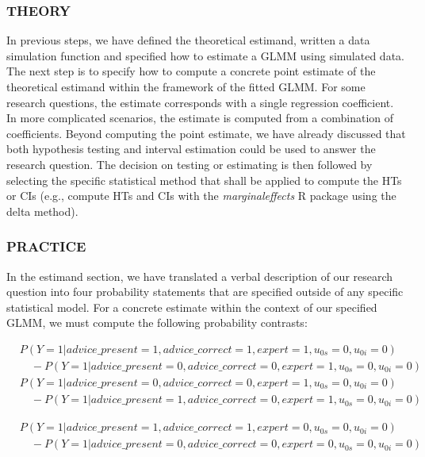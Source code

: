 \documentclass[
  man,
  floatsintext,
  longtable,
  a4paper,
  nolmodern,
  notxfonts,
  notimes,
  colorlinks=true,linkcolor=blue,citecolor=blue,urlcolor=blue]{apa7}
\begin{document}
\subsubsection{THEORY}\label{theory-7}

In previous steps, we have defined the theoretical estimand, written a
data simulation function and specified how to estimate a GLMM using
simulated data. The next step is to specify how to compute a concrete
point estimate of the theoretical estimand within the framework of the
fitted GLMM. For some research questions, the estimate corresponds with
a single regression coefficient. In more complicated scenarios, the
estimate is computed from a combination of coefficients. Beyond
computing the point estimate, we have already discussed that both
hypothesis testing and interval estimation could be used to answer the
research question. The decision on testing or estimating is then
followed by selecting the specific statistical method that shall be
applied to compute the HTs or CIs (e.g., compute HTs and CIs with the
\emph{marginaleffects} R package using the delta method).

\subsubsection{PRACTICE}\label{practice-7}

In the estimand section, we have translated a verbal description of our
research question into four probability statements that are specified
outside of any specific statistical model. For a concrete estimate
within the context of our specified GLMM, we must compute the following
probability contrasts:

\[
\begin{aligned}
& P(Y=1|advice\_present = 1, advice\_correct = 1, expert = 1, u_{0s} = 0, u_{0i} = 0) \\
& \quad - P(Y=1|advice\_present = 0, advice\_correct = 0, expert = 1, u_{0s} = 0, u_{0i} = 0)
\end{aligned}
\] \[
\begin{aligned}
& P(Y=1|advice\_present = 0, advice\_correct = 0, expert = 1, u_{0s} = 0, u_{0i} = 0) \\
& \quad - P(Y=1|advice\_present = 1, advice\_correct = 0, expert = 1, u_{0s} = 0, u_{0i} = 0)
\end{aligned}
\]

\[
\begin{aligned}
& P(Y=1|advice\_present = 1, advice\_correct = 1, expert = 0, u_{0s} = 0, u_{0i} = 0) \\
& \quad - P(Y=1|advice\_present = 0, advice\_correct = 0, expert = 0, u_{0s} = 0, u_{0i} = 0)
\end{aligned}
\]
\end{document}
